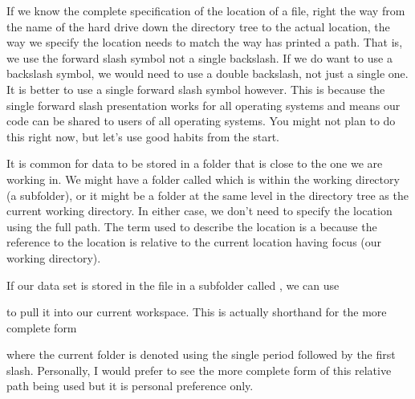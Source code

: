 If we know the complete specification of the location of a file, right the way from the name of the hard drive down the directory tree to the actual location, the way we specify the location needs to match the way \R{} has printed a path. That is, we use the forward slash symbol not a single backslash. If we do want to use a backslash symbol, we would need to use a double backslash, not just a single one. It is better to use a single forward slash symbol however. This is because the single forward slash presentation works for all operating systems and means our code can be shared to users of all operating systems. You might not plan to do this right now, but let's use good habits from the start. 
 
It is common for data to be stored in a folder that is close to the one we are working in. We might have a folder called  which is within the working directory (a subfolder), or it might be a folder at the same level in the directory tree as the current working directory. In either case, we don't need to specify the location using the full path. The term used to describe the location is a  because the reference to the location is relative to the current location having focus (our working directory).  
 
If our data set is stored in the file  in a  subfolder called , we can use  
\begin{knitrout}
\color{fgcolor}\begin{kframe}
\begin{alltt}
\hlstd{> } \hlkwb{=} \hlstd{(}\hlstd{)}
\end{alltt}
\end{kframe}
\end{knitrout}
to pull it into our current workspace. This is actually shorthand for the more complete form 
\begin{knitrout}
\color{fgcolor}\begin{kframe}
\begin{alltt}
\hlstd{> } \hlkwb{=} \hlstd{(}\hlstd{)}
\end{alltt}
\end{kframe}
\end{knitrout}
where the current folder is denoted using the single period followed by the first slash. Personally, I would prefer to see the more complete form of this relative path being used but it is personal preference only. 
 
